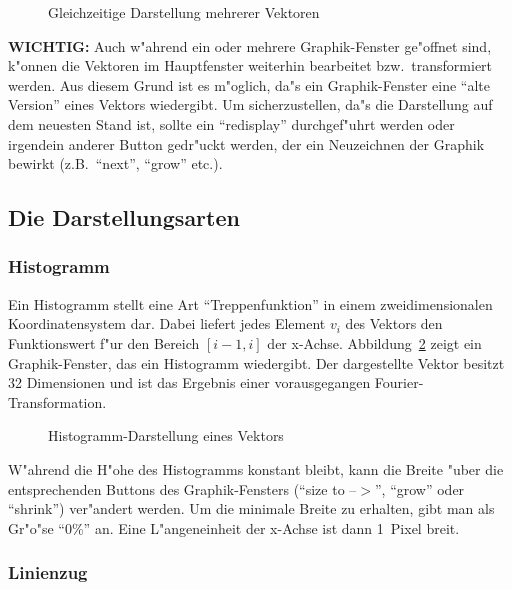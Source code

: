 \begin{figure}[ht]
\centerline{}
\caption{\label{fillup} Gleichzeitige Darstellung mehrerer Vektoren}
\end{figure}

{\bf WICHTIG:} Auch w"ahrend ein oder mehrere Graphik-Fenster ge"offnet 
sind, k"onnen die Vektoren im Hauptfenster weiterhin bearbeitet
bzw.~transformiert werden.
Aus diesem Grund ist es m"oglich, da"s ein Graphik-Fenster eine 
"`alte Version"' eines Vektors wiedergibt. 
Um sicherzustellen, da"s die Darstellung auf dem neuesten Stand ist,
sollte ein "`redisplay"' durchgef"uhrt werden oder irgendein anderer
Button gedr"uckt werden, der ein Neuzeichnen der Graphik bewirkt
(z.B.~"`next"', "`grow"' etc.). 

\subsection{Die Darstellungsarten}

\subsubsection*{Histogramm}

Ein Histogramm stellt eine Art "`Treppenfunktion"' in einem 
zweidimensionalen Koordinatensystem dar. 
Dabei liefert jedes Element $v_{i}$ des Vektors den Funktionswert 
f"ur den Bereich $[i\!-\!1,i]$ der x-Achse.
Abbildung~\ref{histo} zeigt ein Graphik-Fenster, das ein
Histogramm wiedergibt.
Der dargestellte Vektor besitzt 32 Dimensionen und ist das Ergebnis
einer vorausgegangen Fourier-Transformation.

\begin{figure}[ht]
\centerline{}
\caption{\label{histo} Histogramm-Darstellung eines Vektors}
\end{figure} 

W"ahrend die H"ohe des Histogramms konstant bleibt, kann die Breite
"uber die entsprechenden Buttons des Graphik-Fensters ("`size to --$>$"',
"`grow"' oder "`shrink"') ver"andert werden.
Um die minimale Breite zu erhalten, gibt man als Gr"o"se "`0\%"' an.
Eine L"angeneinheit der x-Achse ist dann 1~Pixel breit.
 
\subsubsection*{Linienzug}


